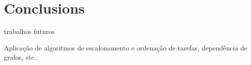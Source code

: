 \section{Conclusions}
\label{sec:conclusions}

	\lipsum[2]

trabalhos futuros

Aplicação de algoritmos de escalonamento e ordenação de tarefas, dependência de
	grafos, etc.

